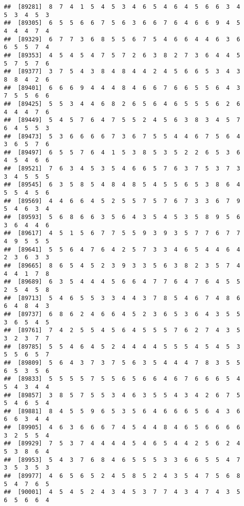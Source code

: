 \documentclass[
]{book}
\begin{document}
\begin{verbatim}
##  [89281]  8  7  4  1  5  4  5  3  4  6  5  4  6  4  5  6  6  3  4  5  3  4  5  3
##  [89305]  6  5  5  6  6  7  5  6  3  6  6  7  6  4  6  6  9  4  5  4  4  4  7  4
##  [89329]  6  7  7  3  6  8  5  5  6  7  5  4  6  6  4  4  6  3  6  6  5  5  7  4
##  [89353]  4  5  4  5  4  7  5  7  2  6  3  8  2  7  3  6  4  4  5  5  7  5  7  6
##  [89377]  3  7  5  4  3  8  4  8  4  4  2  4  5  6  6  5  3  4  3  8  8  4  2  6
##  [89401]  6  6  6  9  4  4  4  8  4  6  6  7  6  6  5  5  6  4  3  7  5  5  6  6
##  [89425]  5  5  3  4  4  6  8  2  6  5  6  4  6  5  5  5  6  2  6  4  4  4  7  6
##  [89449]  5  4  5  7  6  4  7  5  5  2  4  5  6  3  8  3  4  5  7  6  4  5  5  3
##  [89473]  5  3  6  6  6  6  7  3  6  7  5  5  4  4  6  7  5  6  4  3  6  5  7  6
##  [89497]  6  5  5  7  6  4  1  5  3  8  5  3  5  2  2  6  5  3  6  4  5  4  6  6
##  [89521]  7  6  3  4  5  3  5  4  6  6  5  7  6  3  7  5  3  7  3  3  4  5  5  5
##  [89545]  6  3  5  8  5  4  8  4  8  5  4  5  5  6  5  3  8  6  4  5  5  4  5  6
##  [89569]  4  4  6  6  4  5  2  5  5  7  5  7  6  7  3  3  6  7  9  5  4  6  3  4
##  [89593]  5  6  8  6  6  3  5  6  4  3  5  4  5  3  5  8  9  5  6  3  6  4  4  6
##  [89617]  4  5  1  5  6  7  7  5  5  9  3  9  3  5  7  7  6  7  7  4  9  5  5  5
##  [89641]  5  5  6  4  7  6  4  2  5  7  3  3  4  6  5  4  4  6  4  2  3  6  3  3
##  [89665]  8  6  5  4  5  2  3  9  3  3  5  6  3  8  2  3  5  7  4  4  4  1  7  8
##  [89689]  6  3  5  4  4  4  5  6  6  4  7  7  6  4  7  6  4  5  5  2  5  4  5  8
##  [89713]  5  4  6  5  5  3  3  4  4  3  7  8  5  4  6  7  4  8  6  6  4  8  4  3
##  [89737]  6  8  6  2  4  6  6  4  5  2  3  6  5  3  6  4  3  5  5  3  6  5  4  5
##  [89761]  7  4  2  5  5  4  5  6  4  5  5  5  7  6  2  7  4  3  5  3  2  3  7  7
##  [89785]  5  5  4  6  4  5  2  4  4  4  4  5  5  5  4  5  4  5  3  5  5  6  5  7
##  [89809]  5  6  4  3  7  3  7  5  6  3  5  4  4  4  7  8  3  5  5  6  5  3  5  6
##  [89833]  5  5  5  5  7  5  5  6  5  6  6  4  6  7  6  6  6  5  4  5  4  3  4  4
##  [89857]  3  8  5  7  5  5  3  4  6  3  5  5  4  3  4  2  6  7  5  5  4  6  5  4
##  [89881]  8  4  5  5  9  6  5  3  5  6  4  6  6  6  5  6  4  3  6  6  6  3  4  4
##  [89905]  4  6  3  6  6  6  7  4  5  4  4  8  4  6  5  6  6  6  6  3  2  5  5  4
##  [89929]  7  5  3  7  4  4  4  4  5  4  6  5  4  4  2  5  6  2  4  5  3  8  6  4
##  [89953]  5  4  3  7  6  8  4  6  5  5  5  3  3  6  6  5  5  4  7  3  5  3  5  3
##  [89977]  4  6  5  6  5  2  4  5  8  5  2  4  3  5  4  7  5  6  8  5  4  7  6  5
##  [90001]  4  5  4  5  2  4  3  4  5  3  7  7  4  3  4  7  4  3  5  6  5  6  6  4

\end{verbatim}
\end{document}
